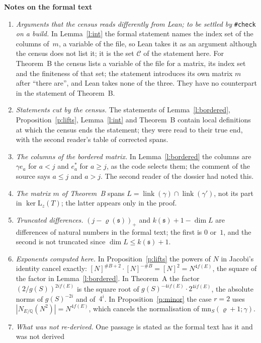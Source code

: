 \documentclass[11pt,a4paper]{article}
\newcommand{\Q}{\mathbb{Q}}
\newcommand{\m}[1]{\mbox{$#1$}}        %
\newcommand{\sect}[2]{\refstepcounter{section}\label{#2}\par\addvspace{19pt plus 4pt minus 2pt}\Needspace{7\baselineskip}%
  \noindent\llap{{\fontsize{13.2}{16}\selectfont\bfseries\color{inkfaint}\thesection}\hspace{9pt}}%
  {\fontsize{13.2}{16}\selectfont\bfseries\color{ink}#1}\par\nopagebreak\vspace{-1pt}}
\theoremstyle{plainx}
\theoremstyle{uprightx}
\newcommand{\fs}{\mathfrak{s}}                      %
\newcommand{\rh}[1]{\varrho(#1)}                    %
\newcommand{\kk}[1]{k(#1)}                          %
\newcommand{\ninf}[1]{f(#1)}                        %
\newcommand{\gS}[1]{g(#1)}                          %
\newcommand{\link}[1]{\operatorname{link}(#1)}      %
\newcommand{\mnorm}[3]{\mathrm{mn}_{#1}(#2;#3)}     %
\newcommand{\zp}[1]{\mathrm{L}_{z}(#1)}               %
\begin{document}
\sect{Notes on the formal text}{s:notes}
\begin{enumerate}[leftmargin=1.6em,itemsep=3pt]
\item \emph{Arguments that the census reads differently from Lean; to be settled by} \texttt{\#check}
\emph{on a build.} In Lemma~\ref{l:int} the formal statement names the index set of the columns of~$m$, a
variable of the file, so Lean takes it as an argument although the census does not list it; it is the set
$\mathcal C$ of the statement here. For Theorem~B the census lists a variable of the file for a matrix, its
index set and the finiteness of that set; the statement introduces its own matrix $m$ after ``there are'', and
Lean takes none of the three. They have no counterpart in the statement of Theorem~B.
\item \emph{Statements cut by the census.} The statements of Lemma~\ref{l:bordered},
Proposition~\ref{p:lifts}, Lemma~\ref{l:int} and Theorem~B contain local definitions at which the census ends
the statement; they were read to their true end, with the second reader's table of corrected spans.
\item \emph{The columns of the bordered matrix.} In Lemma~\ref{l:bordered} the columns are $\gamma e_a$ for
\m{a<j} and $e^*_a$ for \m{a\ge j}, as the code selects them; the comment of the source says \m{a\le j} and
\m{a>j}. The second reader of the dossier had noted this.
\item \emph{The matrix $m$ of Theorem~B} spans \m{L=\link{\gamma}\cap\link{\gamma'}}, not its part in
\m{\ker\zp{T}}; the latter appears only in the proof.
\item \emph{Truncated differences.} \m{(j-\rh{\fs})_+} and \m{\kk{\fs}+1-\dim L} are differences of natural
numbers in the formal text; the first is $0$ or~$1$, and the second is not truncated since
\m{\dim L\le\kk{\fs}+1}.
\item \emph{Exponents computed here.} In Proposition~\ref{p:lifts} the powers of $N$ in Jacobi's identity
cancel exactly: \m{[N]^{\#B+2}\cdot[N]^{-\#B}=[N]^2=N^{4\ninf{E}}}, the square of the factor in
Lemma~\ref{l:bordered}. In Theorem~A the factor \m{(2/\gS{S})^{2i\ninf{E}}} is the square root of
\m{\gS{S}^{-4i\ninf{E}}\cdot2^{4i\ninf{E}}}, the absolute norms of \m{\gS{S}^{-2i}} and of~$4^{i}$. In
Proposition~\ref{p:minor} the case \m{r=2} uses \m{|N_{E/\Q}(N^2)|=N^{4\ninf{E}}}, which cancels the
normalisation of \m{\mnorm{S}{\varrho+1}{\gamma}}.
\item \emph{What was not re-derived.} One passage is stated as the formal text has it and was not derived

\end{enumerate}
\end{document}
